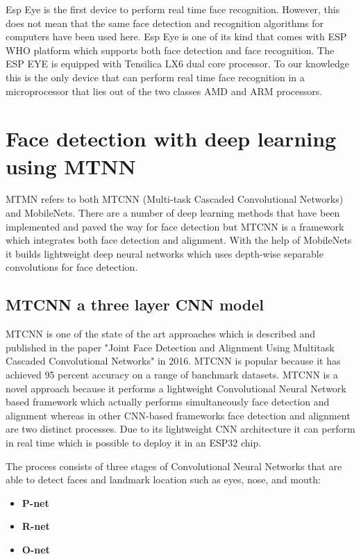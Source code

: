 Esp Eye is the first device to perform real time face recognition. However, this does not mean that the same face detection and recognition algorithms for computers have been used here. Esp Eye is one of its kind that comes with ESP WHO \cite{esp-who} platform which supports both face detection and face recognition. The ESP EYE \cite{espeye} is equipped with Tensilica LX6 dual core processor. To our knowledge this is the only device that can perform real time face recognition in a microprocessor that lies out of the two classes AMD and ARM processors. 

\section{Face detection with deep learning using MTNN}

MTMN refers to both MTCNN (Multi-task Cascaded Convolutional Networks) and MobileNets. There are a number of deep learning methods that have been implemented and paved the way for face detection but MTCNN is a framework which integrates both face detection and alignment. With the help of MobileNets it builds lightweight deep neural networks which uses depth-wise separable convolutions for face detection.


\subsection{MTCNN a three layer CNN model}

MTCNN is one of the state of the art approaches which is described and published in the paper "Joint Face Detection and Alignment Using Multitask Cascaded Convolutional Networks" \cite{refmtcnn} in 2016. MTCNN is popular because it has achieved 95 percent accuracy on a range of banchmark datasets. MTCNN is a novel approach because it performs a lightweight Convolutional Neural Network based framework which actually performs simultaneously face detection and alignment whereas in other CNN-based frameworks face detection and alignment are two distinct processes.   
Due to its lightweight CNN architecture it can perform in real time which is possible to deploy it in an ESP32 chip. 

The process consists of three stages of Convolutional Neural Networks that are able to detect faces and landmark location such as eyes, nose, and mouth: 

\begin{itemize}
    \item \textbf{P-net} 
    \item \textbf{R-net} 
    \item \textbf{O-net} 
\end{itemize}


